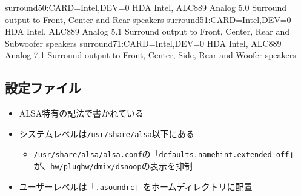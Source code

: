 \documentclass[mingoth,a4paper]{jsarticle}
\begin{document}
\begin{commandline}
surround50:CARD=Intel,DEV=0
    HDA Intel, ALC889 Analog
    5.0 Surround output to Front, Center and Rear speakers
surround51:CARD=Intel,DEV=0
    HDA Intel, ALC889 Analog
    5.1 Surround output to Front, Center, Rear and Subwoofer speakers
surround71:CARD=Intel,DEV=0
    HDA Intel, ALC889 Analog
    7.1 Surround output to Front, Center, Side, Rear and Woofer speakers
\end{commandline}

\subsection{設定ファイル}
\begin{itemize}
\item ALSA特有の記法で書かれている
\item システムレベルは{\tt /usr/share/alsa}以下にある
  \begin{itemize}
  \item {\tt /usr/share/alsa/alsa.conf}の「{\tt defaults.namehint.extended off}」が、{\tt hw/plughw/dmix/dsnoop}の表示を抑制
  \end{itemize}
\item ユーザーレベルは「{\tt .asoundrc}」をホームディレクトリに配置
\end{itemize}
\end{document}
